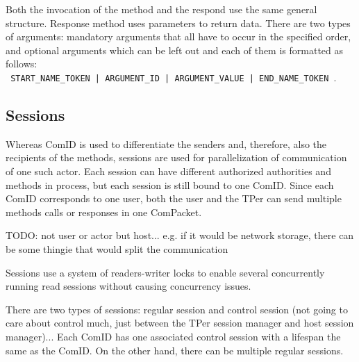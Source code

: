 Both the invocation of the method and the respond use the same general structure. Response method uses parameters to return data.
There are two types of arguments: mandatory arguments that all have to occur in the specified order, and optional arguments which can be left out and each of them is formatted as follows: \\ \verb# START_NAME_TOKEN | ARGUMENT_ID | ARGUMENT_VALUE | END_NAME_TOKEN #.




\subsection{Sessions}

Whereas ComID is used to differentiate the senders and, therefore, also the recipients of the methods, sessions are used for parallelization of communication of one such actor. Each session can have different authorized authorities and methods in process, but each session is still bound to one ComID. Since each ComID corresponds to one user, both the user and the TPer can send multiple methods calls or responses in one ComPacket.

TODO: not user or actor but host... e.g.  if it would be network storage, there can be some thingie that would split the communication 

Sessions use a system of readers-writer locks to enable several concurrently running read sessions without causing concurrency issues.

There are two types of sessions: regular session and control session (not going to care about control much, just between the TPer session manager and host session manager)...
Each ComID has one associated control session with a lifespan the same as the ComID. On the other hand, there can be multiple regular sessions.

